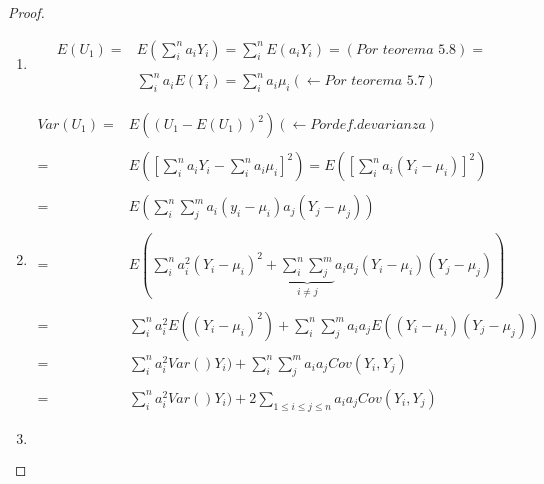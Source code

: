 \documentclass[12pt,letterpaper]{article}
\theoremstyle{definition}
\begin{document}
\begin{proof}
\hfill
	\begin{enumerate}
		\item 
		\[
		\begin{array}{rl}
			E(U_1)= &E(\sum^n_i  a_iY_i)=\sum^n_iE(a_iY_i)=(\mathrm{\textit{Por teorema 5.8}})=\\ \\
			&\sum^n_i a_i E(Y_i)=\sum^n_ia_i\mu_i(\leftarrow \textit{Por teorema 5.7})
		\end{array}
		\]
		\item 
		\[
		\begin{array}{rl}
			Var(U_1)=& E((U_1-E(U_1))^2)(\leftarrow Por def. de varianza)\\ \\
			=& E(\left[\sum^n_ia_iY_i-\sum^n_ia_i\mu_i\right]^2)=E(\left[\sum^n_ia_i(Y_i-\mu_i)\right]^2)\\ \\
			=& E(\sum^n_i\sum^m_j a_i(y_i-\mu_i)a_j(Y_j-\mu_j))\\ \\
			=& E(\sum^n_ia_i^2(Y_i-\mu_i)^2+\underbrace{\sum^n_i\sum^m_j}_{i\neq j}a_ia_j(Y_i-\mu_i)(Y_j-\mu_j))\\ \\
			=& \sum^n_ia_i^2 E((Y_i-\mu_i)^2)+\sum^n_i\sum^m_ja_ia_j E((Y_i-\mu_i)(Y_j-\mu_j))\\ \\
			=&\sum^n_ia_i^2 Var()Y_i)+\sum^n_i\sum^m_j a_ia_j Cov(Y_i,Y_j)\\ \\
			=& \sum^n_ia_i^2 Var()Y_i)+ 2\sum_{1\leq i\leq j\leq n}a_ia_j Cov(Y_i,Y_j)
		\end{array}
		\]
		\item 
		\[
		\begin{array}{rl}
			&\\
			&
		\end{array}
		\]
	\end{enumerate}
\end{proof}
\end{document}
